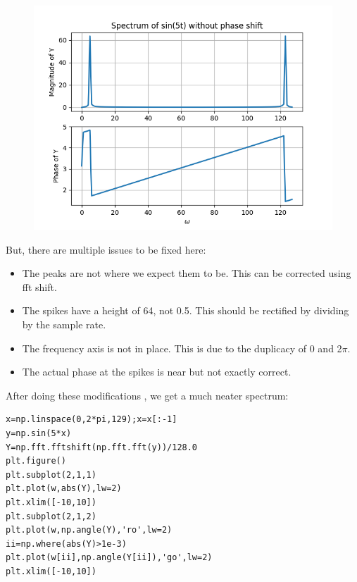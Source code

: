 \documentclass[11pt, a4paper]{article}
\begin{document}
\begin{figure}[!tbh]
\centering
\includegraphics[scale=0.5]{assgn9_plot1.png} 
\label{fig1}
\end{figure} 

But, there are multiple issues to be fixed here:
\begin{itemize}
\item The peaks are not where we expect them to be. This can be corrected using fft shift.
\item The spikes have a height of 64, not 0.5. This should be rectified by dividing by the sample rate.
\item The frequency axis is not in place. This is due to the duplicacy of 0
and 2$\pi$.
\item The actual phase at the spikes is near but not exactly correct.
\end{itemize}

After doing these modifications , we get a much neater spectrum:
\begin{verbatim}
x=np.linspace(0,2*pi,129);x=x[:-1]
y=np.sin(5*x)
Y=np.fft.fftshift(np.fft.fft(y))/128.0
plt.figure()
plt.subplot(2,1,1)
plt.plot(w,abs(Y),lw=2)
plt.xlim([-10,10])
plt.subplot(2,1,2)
plt.plot(w,np.angle(Y),'ro',lw=2)
ii=np.where(abs(Y)>1e-3)
plt.plot(w[ii],np.angle(Y[ii]),'go',lw=2)
plt.xlim([-10,10])
\end{verbatim}
\end{document}
